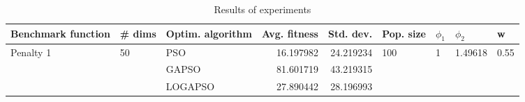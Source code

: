 \begin{table}
\centering
\caption{Results of experiments}
\begin{tabular}{lllrrllll}
\toprule
        Benchmark function &             \# dims & Optim. algorithm &  Avg. fitness &  Std. dev. &            Pop. size &         $\phi_{1}$ &               $\phi_{2}$ &                     w \\
\midrule
\multirow{3}{*}{Penalty 1} & \multirow{3}{*}{50} &              PSO &     16.197982 &  24.219234 & \multirow{3}{*}{100} & \multirow{3}{*}{1} & \multirow{3}{*}{1.49618} & \multirow{3}{*}{0.55} \\
                           &                     &            GAPSO &     81.601719 &  43.219315 &                      &                    &                          &                       \\
                           &                     &          LOGAPSO &     27.890442 &  28.196993 &                      &                    &                          &                       \\
\bottomrule
\end{tabular}
\end{table}
